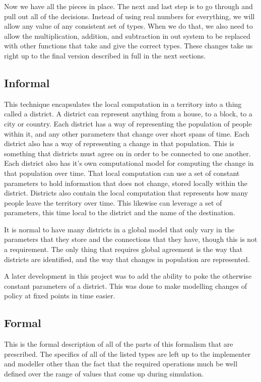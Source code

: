 \documentclass[twocolumn]{article}
\begin{document}
Now we have all the pieces in place. The next and last step is to go through and pull out all of the decisions. Instead of using real numbers for everything, we will allow any value of any consistent set of types. When we do that, we also need to allow the multiplication, addition, and subtraction in out system to be replaced with other functions that take and give the correct types. These changes take us right up to the final version described in full in the next sections.

\subsection{Informal}

This technique encapsulates the local computation in a territory into a thing called a district. 
A district can represent anything from a house, to a block, to a city or country.
Each district has a way of representing the population of people within it, and any other parameters that change over short spans of time.
Each district also has a way of representing a change in that population. This is something that districts must agree on in order to be connected to one another.
Each district also has it's own computational model for computing the change in that population over time. 
That local computation can use a set of constant parameters to hold information that does not change, stored locally within the district.
Districts also contain the local computation that represents how many people leave the territory over time. This likewise can leverage a set of parameters, this time local to the district and the name of the destination.

It is normal to have many districts in a global model that only vary in the parameters that they store and the connections that they have, though this is not a requirement. The only thing that requires global agreement is the way that districts are identified, and the way that changes in population are represented.

A later development in this project was to add the ability to poke the otherwise constant parameters of a district. This was done to make modelling changes of policy at fixed points in time easier.

\subsection{Formal}

This is the formal description of all of the parts of this formalism that are prescribed. The specifics of all of the listed types are left up to the implementer and modeller other than the fact that the required operations much be well defined over the range of values that come up during simulation.
\end{document}
